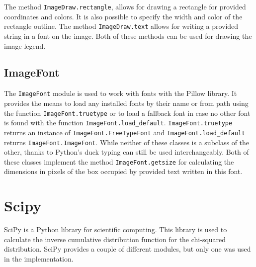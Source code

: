 \documentclass[
  digital, %
  color,   %
  oneside, %
  lof,     %
  nolot,     %
]{fithesis4}
\begin{document}
The method \texttt{ImageDraw.rectangle}, allows for drawing a rectangle for provided coordinates and colors.
It is also possible to specify the width and color of the rectangle outline.
The method \texttt{ImageDraw.text} allows for writing a provided string in a font on the image.
Both of these methods can be used for drawing the image legend. \cite{pillowimagedraw}

\subsection{ImageFont}
\label{ssec-imagefont}

The \texttt{ImageFont} module is used to work with fonts with the Pillow library.
It provides the means to load any installed fonts by their name or from path using the function \texttt{ImageFont.truetype} or to load a fallback font in case no other font is found with the function \texttt{ImageFont.load\_default}.
\texttt{ImageFont.truetype} returns an instance of \texttt{ImageFont.FreeTypeFont} and \texttt{ImageFont.load\_default} returns \texttt{ImageFont.ImageFont}.
While neither of these classes is a subclass of the other, thanks to Python's duck typing can still be used interchangeably.
Both of these classes implement the method \texttt{ImageFont.getsize} for calculating the dimensions in pixels of the box occupied by provided text written in this font. \cite{pillowimagefont}




\section{Scipy}
\label{sec:scipy}
SciPy\cite{scipy20} is a Python library for scientific computing.
This library is used to calculate the inverse cumulative distribution function for the chi-squared distribution.
SciPy provides a couple of different modules, but only one was used in the implementation.
\end{document}
